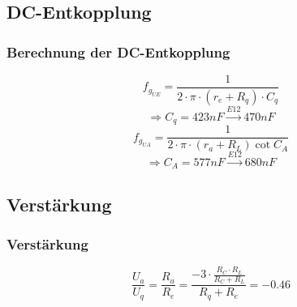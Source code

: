 \subsection{DC-Entkopplung}
\begin{frame}
	\frametitle{Berechnung der DC-Entkopplung}
	\[ f_{g_{UE}} = \frac{1}{2 \cdot \pi \cdot (r_e + R_q) \cdot C_q} \]
	\[ \Rightarrow C_q = 423nF \xrightarrow{E12} 470nF \]
	\[ f_{g_{UA}} = \frac{1}{2 \cdot \pi \cdot (r_a + R_L) \cot C_A} \]
	\[ \Rightarrow C_A = 577nF \xrightarrow{E12} 680nF \]
\end{frame}

\subsection{Verstärkung}
\begin{frame}
	\frametitle{Verstärkung}
	\[ \frac{U_a}{U_q} = \frac{R_a}{R_e} = 
		\frac{-3 \cdot \frac{R_C \cdot R_L}{R_C + R_L}}{R_q + R_e} 
		= -0.46 \]
\end{frame}

